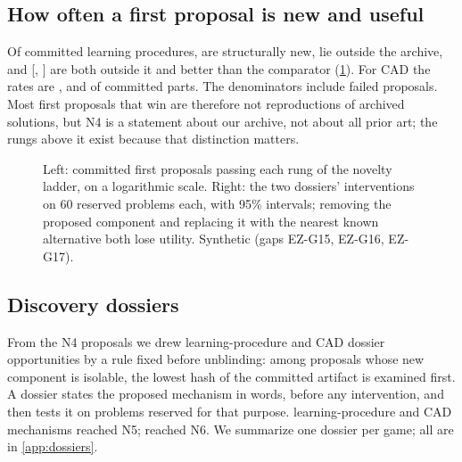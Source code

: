 \subsection{How often a first proposal is new and useful}

Of \syn[EZ-G20]{\EZctxA} committed learning procedures, \syn[EZ-G15]{\EZnovAone\%} are structurally
new, \syn[EZ-G15]{\EZnovAtwo\%} lie outside the archive, and \syn[EZ-G15]{\EZnovAfour\%}
[\syn[EZ-G15]{\EZnovAfourLo}, \syn[EZ-G15]{\EZnovAfourHi}] are both outside it and better than the
comparator (\cref{fig:discovery}). For CAD the rates are \syn[EZ-G15]{\EZnovCone\%},
\syn[EZ-G15]{\EZnovCtwo\%} and \syn[EZ-G15]{\EZnovCfour\%} of \syn[EZ-G20]{\EZspecC} committed parts.
The denominators include failed proposals. Most first proposals that win are therefore not
reproductions of archived solutions, but N4 is a statement about our archive, not about all prior
art; the rungs above it exist because that distinction matters.

\begin{figure}[t]
\centering

\caption{Left: committed first proposals passing each rung of the novelty ladder, on a logarithmic
scale. Right: the two dossiers' interventions on 60 reserved problems each, with 95\% intervals;
removing the proposed component and replacing it with the nearest known alternative both lose
utility. Synthetic (gaps EZ-G15, EZ-G16, EZ-G17).}
\label{fig:discovery}
\end{figure}

\subsection{Discovery dossiers}

From the N4 proposals we drew \syn[EZ-G15]{\EZdossA} learning-procedure and \syn[EZ-G15]{\EZdossC}
CAD dossier opportunities by a rule fixed before unblinding: among proposals whose new component is
isolable, the lowest hash of the committed artifact is examined first. A dossier states the proposed
mechanism in words, before any intervention, and then tests it on problems reserved for that purpose.
\syn[EZ-G15]{\EZnFiveA} learning-procedure and \syn[EZ-G15]{\EZnFiveC} CAD mechanisms reached N5;
\syn[EZ-G15]{\EZnSix} reached N6. We summarize one dossier per game; all are in \cref{app:dossiers}.

